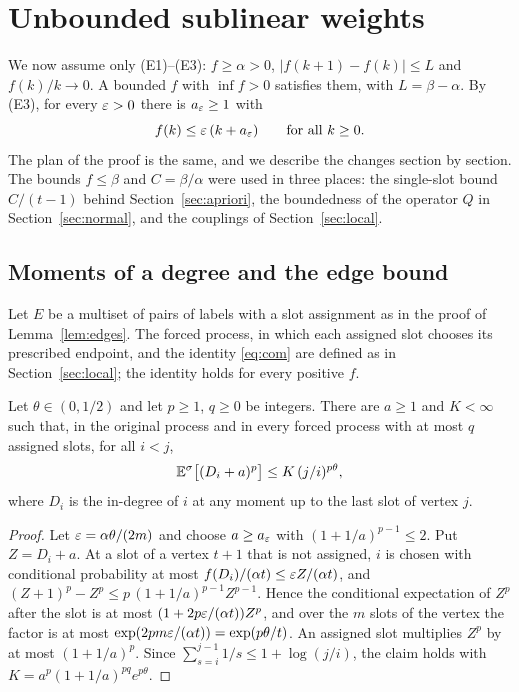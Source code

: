 \section{Unbounded sublinear weights}\label{sec:sublinear}

We now assume only \textup{(E1)--(E3)}: $f\ge\alpha>0$, $|f(k+1)-f(k)|\le L$ and $f(k)/k\to0$. A bounded $f$ with
$\inf f>0$ satisfies them, with $L=\beta-\alpha$. By \textup{(E3)}, for every $\varepsilon>0$ there is $a_\varepsilon\ge1$ with
\begin{equation}\label{eq:lin}
    f(k)\le\varepsilon\,(k+a_\varepsilon)\qquad\text{for all }k\ge0 .
\end{equation}
The plan of the proof is the same, and we describe the changes section by section. The bounds $f\le\beta$ and
$C=\beta/\alpha$ were used in three places: the single-slot bound $C/(t-1)$ behind
Section~\ref{sec:apriori}, the boundedness of the operator $Q$ in Section~\ref{sec:normal}, and the couplings of
Section~\ref{sec:local}.

\subsection{Moments of a degree and the edge bound}

Let $E$ be a multiset of pairs of labels with a slot assignment as in the proof of Lemma~\ref{lem:edges}. The
forced process, in which each assigned slot chooses its prescribed endpoint, and the identity \eqref{eq:com} are
defined as in Section~\ref{sec:local}; the identity holds for every positive $f$.

\begin{lemma}\label{lem:moments}
Let $\theta\in(0,1/2)$ and let $p\ge1$, $q\ge0$ be integers. There are $a\ge1$ and $K<\infty$ such that, in the
original process and in every forced process with at most $q$ assigned slots, for all $i<j$,
\[
    \mathbb{E}^\sigma\bigl[(D_i+a)^p\bigr]\le K\,(j/i)^{p\theta},
\]
where $D_i$ is the in-degree of $i$ at any moment up to the last slot of vertex $j$.
\end{lemma}

\begin{proof}
Let $\varepsilon=\alpha\theta/(2m)$ and choose $a\ge a_\varepsilon$ with $(1+1/a)^{p-1}\le2$. Put $Z=D_i+a$. At a slot of a vertex
$t+1$ that is not assigned, $i$ is chosen with conditional probability at most $f(D_i)/(\alpha t)\le\varepsilon Z/(\alpha t)$,
and $(Z+1)^p-Z^p\le p\,(1+1/a)^{p-1}Z^{p-1}$. Hence the conditional expectation of $Z^p$ after the slot is at most
$(1+2p\varepsilon/(\alpha t))Z^p$, and over the $m$ slots of the vertex the factor is at most
$\exp(2pm\varepsilon/(\alpha t))=\exp(p\theta/t)$. An assigned slot multiplies $Z^p$ by at most $(1+1/a)^p$. Since
$\sum_{s=i}^{j-1}1/s\le1+\log(j/i)$, the claim holds with $K=a^p(1+1/a)^{pq}e^{p\theta}$.
\end{proof}

